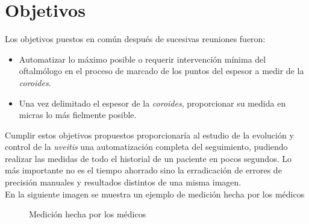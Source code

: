 \section{Objetivos}
Los objetivos puestos en común después de sucesivas reuniones fueron:
\begin{itemize}
\item Automatizar lo máximo posible o requerir intervención mínima del
  oftalmólogo en el proceso de marcado de los puntos del espesor a
  medir de la \emph{\gls{coroides}}.
\item Una vez delimitado el espesor de la \emph{\gls{coroides}},
  proporcionar su medida en micras lo más fielmente posible.
\end{itemize}
Cumplir estos objetivos propuestos proporcionaría al estudio de la
evolución y control de la \emph{\gls{uveitis}} una automatización
completa del seguimiento, pudiendo realizar las medidas de todo el
historial de un paciente en pocos segundos. Lo más importante no es el
tiempo ahorrado sino la erradicación de errores de precisión manuales
y resultados distintos de una misma imagen.\\
En la siguiente imagen se muestra un ejemplo de medición hecha por los médicos
    \begin{figure}[H]
      \caption{Medición hecha por los médicos}
      \centering \setlength\fboxsep{0pt} \setlength\fboxrule{0.5pt}
    \end{figure}

